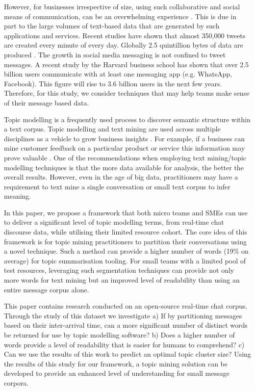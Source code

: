 However, for businesses irrespective of size, using such collaborative and social means of communication, can be an overwhelming experience \cite{huffpost2016}. This is due in part to the large volumes of text-based data that are generated by such applications and services. Recent studies have shown that almost 350,000 tweets are created every minute of every day. Globally 2.5 quintillion bytes of data are produced \cite{venturebeat2016}. The growth in social media messaging is not confined to tweet messages. A recent study \cite{socmsg2017} by the Harvard business school has shown that over 2.5 billion users communicate with at least one messaging app (e.g. WhatsApp, Facebook). This figure will rise to 3.6 billion users in the next few years. Therefore, for this study, we consider techniques that may help teams make sense of their message based data.   

Topic modelling is a frequently used process to discover semantic structure within a text corpus. Topic modelling and text mining are used across multiple disciplines \cite{tmvalue2017} as a vehicle to grow business insights \cite{dti2017}. For example, if a business can mine customer feedback on a particular product or service this information may prove valuable \cite{softadvice2015}. One of the recommendations when employing text mining/topic modelling techniques is that the more data available for analysis, the better the overall results. However, even in the age of big data, practitioners may have a requirement to text mine a single conversation or small text corpus to infer meaning. 

In this paper, we propose a framework that both micro teams and SMEs can use to deliver a significant level of topic modelling terms, from real-time chat discourse data, while utilising their limited resource cohort. The core idea of this framework is for topic mining practitioners to partition their conversations using a novel technique. Such a method can provide a higher number of words (19\% on average) for topic summarisation tooling. For small teams with a limited pool of test resources, leveraging such segmentation techniques can provide not only more words for text mining but an improved level of readability than using an entire message corpus alone.

This paper contains research conducted on an open-source real-time chat corpus. Through the study of this dataset we investigate a) If by partitioning messages based on their inter-arrival time, can a more significant number of distinct words be returned for use by topic modelling software? b) Does a higher number of words provide a level of readability that is easier for humans to comprehend? c) Can we use the results of this work to predict an optimal topic cluster size? Using the results of this study for our framework, a topic mining solution can be developed to provide an enhanced level of understanding for small message corpora.


